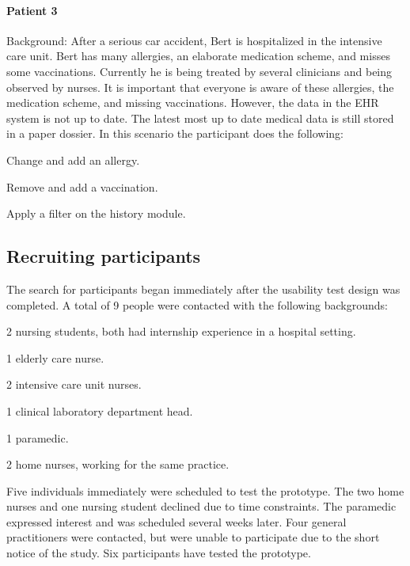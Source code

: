     \paragraph{Patient 3} Background: After a serious car accident, Bert is hospitalized in the intensive care unit. Bert has many allergies, an elaborate medication scheme, and misses some vaccinations. Currently he is being treated by several clinicians and being observed by nurses. It is important that everyone is aware of these allergies, the medication scheme, and missing vaccinations. However, the data in the EHR system is not up to date. The latest most up to date medical data is still stored in a paper dossier. In this scenario the participant does the following:
    \vspace{-16pt}
    \begin{myenumerate}
        \item Change and add an allergy.
        \item Remove and add a vaccination.
        \item Apply a filter on the history module.
    \end{myenumerate}

    \subsection{Recruiting participants}

    The search for participants began immediately after the usability test design was completed. A total of 9 people were contacted with the following backgrounds:
    \vspace{-14pt}
    \begin{myitemize}
        \item 2 nursing students, both had internship experience in a hospital setting.
        \item 1 elderly care nurse.
        \item 2 intensive care unit nurses.
        \item 1 clinical laboratory department head.
        \item 1 paramedic.
        \item 2 home nurses, working for the same practice.
    \end{myitemize}

    \noindent Five individuals immediately were scheduled to test the prototype. The two home nurses and one nursing student declined due to time constraints. The paramedic expressed interest and was scheduled several weeks later. Four general practitioners were contacted, but were unable to participate due to the short notice of the study. Six participants have tested the prototype.

